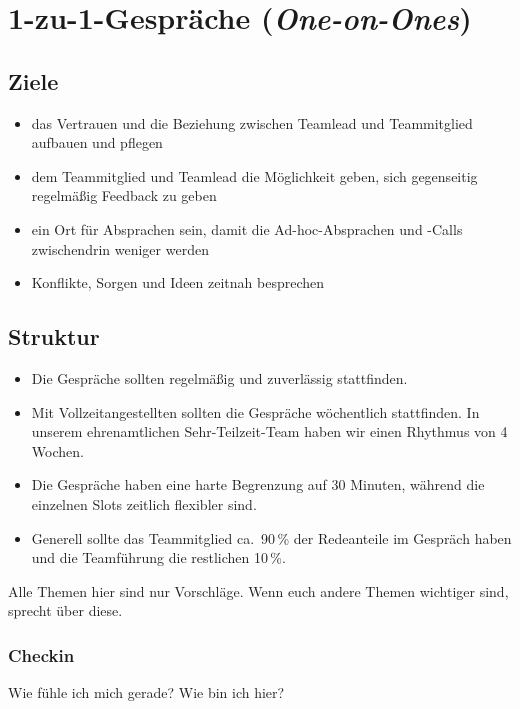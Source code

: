 \section{1-zu-1-Gespräche (\emph{One-on-Ones})}
\label{1-zu-1}

\subsection{Ziele}

\begin{itemize}
 \item das Vertrauen und die Beziehung zwischen Teamlead und Teammitglied aufbauen und pflegen
 \item dem Teammitglied und Teamlead die Möglichkeit geben, sich gegenseitig regelmäßig Feedback zu geben
 \item ein Ort für Absprachen sein, damit die Ad-hoc-Absprachen und -Calls zwischendrin weniger werden
 \item Konflikte, Sorgen und Ideen zeitnah besprechen
\end{itemize}

\subsection{Struktur}

\begin{itemize}
 \item Die Gespräche sollten regelmäßig und zuverlässig stattfinden.
 \item Mit Vollzeitangestellten sollten die Gespräche wöchentlich stattfinden. In unserem ehrenamtlichen Sehr-Teilzeit-Team haben wir einen Rhythmus von 4 Wochen.
 \item Die Gespräche haben eine harte Begrenzung auf 30 Minuten, während die einzelnen Slots zeitlich flexibler sind.
 \item Generell sollte das Teammitglied ca.~90\,\% der Redeanteile im Gespräch haben und die Teamführung die restlichen 10\,\%.
\end{itemize}

Alle Themen hier sind nur Vorschläge. Wenn euch andere Themen wichtiger sind, sprecht über diese.

\subsubsection{Checkin}
Wie fühle ich mich gerade? Wie bin ich hier?


